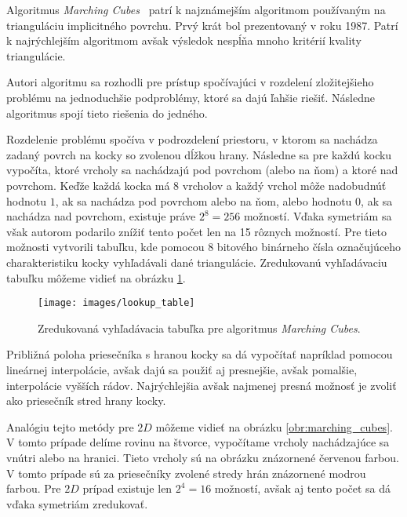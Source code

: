 Algoritmus \textit{Marching Cubes}~\cite{lorensen1987marching} patrí k najznámejším algoritmom používaným
na trianguláciu implicitného povrchu. Prvý krát bol prezentovaný v roku 1987. Patrí k najrýchlejším
algoritmom avšak výsledok nespĺňa mnoho kritérií kvality triangulácie. 

Autori algoritmu sa rozhodli pre prístup spočívajúci v rozdelení zložitejšieho problému na 
jednoduchšie podproblémy, ktoré sa dajú ľahšie riešiť. Následne algoritmus 
spojí tieto riešenia do jedného.

Rozdelenie problému spočíva v podrozdelení priestoru, v ktorom sa nachádza zadaný povrch na kocky 
so zvolenou dĺžkou hrany. 
Následne sa pre každú kocku vypočíta, ktoré vrcholy sa nachádzajú pod povrchom (alebo na ňom) 
a ktoré nad povrchom. Keďže každá kocka má 8 vrcholov a každý vrchol môže nadobudnúť hodnotu $1$, ak sa 
nachádza pod povrchom alebo na ňom, alebo hodnotu $0$, ak sa nachádza nad povrchom, existuje práve 
$2^8 = 256$ možností. Vďaka symetriám sa však autorom podarilo znížiť tento počet len na 15 rôznych možností.
Pre tieto možnosti vytvorili tabuľku, kde pomocou 8 bitového binárneho čísla označujúceho charakteristiku
kocky vyhľadávali dané triangulácie. Zredukovanú vyhľadávaciu tabuľku môžeme vidieť na obrázku \ref{obr:lookup_table}.

\begin{figure}
    \centerline{\texttt{[image: images/lookup\_table]}}
    \caption[Zredukovaná vyhľadávacia tabuľka pre algoritmus Marching Cubes]
    {Zredukovaná vyhľadávacia tabuľka \cite{smistad2012real} pre algoritmus \textit{Marching Cubes}.}
    \label{obr:lookup_table}
\end{figure}

Približná poloha priesečníka s hranou kocky sa dá vypočítať napríklad pomocou lineárnej interpolácie, avšak 
dajú sa použiť aj presnejšie, avšak pomalšie, interpolácie vyšších rádov. Najrýchlejšia avšak najmenej presná
možnosť je zvoliť ako priesečník stred hrany kocky.

Analógiu tejto metódy pre $2D$ môžeme vidieť na obrázku \ref{obr:marching_cubes}. V tomto prípade delíme rovinu na štvorce, 
vypočítame vrcholy nachádzajúce sa vnútri alebo na hranici. Tieto vrcholy sú na obrázku znázornené 
červenou farbou. V tomto prípade sú za priesečníky zvolené stredy hrán znázornené modrou farbou. 
Pre $2D$ prípad existuje len $2^4 = 16$ možností, avšak aj tento počet sa dá vďaka symetriám zredukovať.


